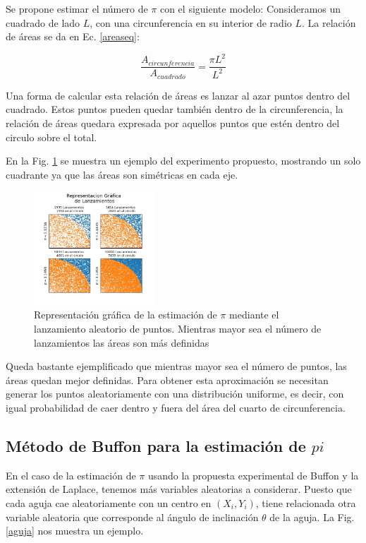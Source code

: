 \documentclass{rbf}
\begin{document}
Se propone estimar el número de $\pi$ con el siguiente modelo:
Consideramos un cuadrado de lado $L$, con una circunferencia en su interior de radio $L$.
La relación de áreas se da en Ec. \ref{areaseq}:

\begin{equation}
	\frac{A_{circunferencia}}{A_{cuadrado}}=\frac{\pi L^2}{L^2}
\label{areaseq}	
\end{equation}

Una forma de calcular esta relación de áreas es lanzar al azar puntos dentro del cuadrado. Estos puntos pueden quedar también dentro de la circunferencia, la relación de áreas quedara expresada por aquellos puntos que estén dentro del circulo sobre el total.

En la Fig. \ref{area} se muestra un ejemplo del experimento propuesto, mostrando un solo cuadrante ya que las áreas son simétricas en cada eje.

\begin{figure}[htbp!]
 \centering
  \includegraphics[width=0.4\textwidth]{figures/areas.jpg}
	\caption{Representación gráfica de la estimación de $\pi$ mediante el lanzamiento aleatorio de puntos. Mientras mayor sea el número de lanzamientos las áreas son más definidas}
 \label{area}
\end{figure}

Queda bastante ejemplificado que mientras mayor sea el número de puntos, las áreas quedan mejor definidas.
Para obtener esta aproximación se necesitan generar los puntos aleatoriamente con una distribución uniforme, es decir, con igual probabilidad de caer dentro y fuera del área del cuarto de circunferencia.

\subsection{Método de Buffon para la estimación de $pi$}

En el caso de la estimación de $\pi$ usando la propuesta experimental de Buffon y la extensión de Laplace, tenemos más variables aleatorias a considerar. Puesto que cada aguja cae aleatoriamente con un centro en $(X_i,Y_i)$, tiene relacionada otra variable aleatoria que corresponde al ángulo de inclinación $\theta$ de la aguja. La Fig.\ref{aguja} nos muestra un ejemplo.
\end{document}
